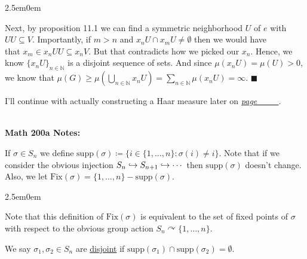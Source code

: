 \documentclass{book}
\newcommand{\inLinkRap}[2]{{\color{blue}\hyperlink{#1}{\textit{#2}}}}
\renewcommand{\hookrightarrow}{\lhook\joinrel\rightarrow}
\newcommand{\hTwo}{%
\color{Black}%
   \fontsize{13}{15}\selectfont%
}
\newcommand{\myComment}{%
   \color{RawerSienna}%
   \fontsize{12}{14}\selectfont%
}
\newenvironment{myIndent}{%
   \begin{adjustwidth}{2.5em}{0em}%
}{%
   \end{adjustwidth}%
}
\newcommand{\udefine}[1]{{%
   \setulcolor{Red}%
   \setul{0.14em}{0.07em}%
   \ul{#1}%
}}
\newcommand{\blect}[1]{{\color{MidnightBlue}\textbf{#1}}}
\newcommand{\supp}{\mathrm{supp}}
\newcommand{\Fix}{\mathrm{Fix}}
\newcommand{\mySepTwo}[1][.]{%
   {\noindent\color{#1}{\rule{6.5in}{0.5mm}}}\\%
}
\newcommand{\retTwo}{\hfill\bigbreak}
\begin{document}
\begin{itemize}
\begin{myIndent}
		Next, by proposition 11.1 we can find a symmetric neighborhood $U$ of $e$ with\\ $UU \subseteq V$. Importantly, if $m > n$ and $x_n U \cap x_m U \neq \emptyset$ then we would have\\ that $x_m \in x_n UU \subseteq x_n V$. But that contradicts how we picked our $x_n$. Hence, we\\ know $\{x_n U\}_{n \in \mathbb{N}}$ is a disjoint sequence of sets. And since $\mu(x_n U) = \mu(U) > 0$,\\ we know that $\mu(G) \geq \mu(\bigcup_{n \in \mathbb{N}} x_n U) = \sum_{n \in \mathbb{N}} \mu(x_n U) = \infty$. $\blacksquare$\retTwo
	\end{myIndent}
\end{itemize}

\hTwo\hypertarget{page 353 reference}{I'll} continue with actually constructing a Haar measure later on \inLinkRap{idk reference 4}{page \_\_\_}.

\mySepTwo

\blect{Math 200a Notes:}\retTwo

If $\sigma \in S_n$ we define $\supp(\sigma) \coloneqq \{i \in \{1, \ldots, n\} : \sigma(i) \neq i\}$. Note that if we consider the obvious injection $S_n \hookrightarrow S_{n+1} \hookrightarrow \cdots$ then $\supp(\sigma)$ doesn't change. Also, we let $\Fix(\sigma) = \{1, \ldots, n\} - \supp(\sigma)$.
\begin{myIndent}\myComment
	Note that this definition of $\Fix(\sigma)$ is equivalent to the set of fixed points of $\sigma$ with respect to the obvious group action $S_n \curvearrowright \{1, \ldots, n\}$.\retTwo
\end{myIndent}

We say $\sigma_1, \sigma_2 \in S_n$ are \udefine{disjoint} if $\supp(\sigma_1) \cap \supp(\sigma_2) = \emptyset$.\retTwo
\end{document}
